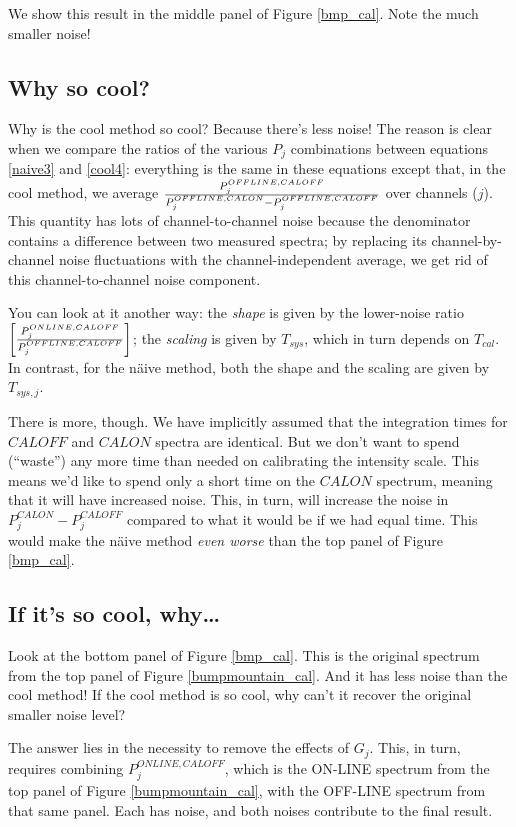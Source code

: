 \noindent We show this result in the middle panel of Figure
\ref{bmp_cal}. Note the much smaller noise!


\subsection{Why so cool?}

	Why is the cool method so cool? Because there's less noise! The
reason is clear when we compare the ratios of the various $P_j$
combinations between equations \ref{naive3} and \ref{cool4}: everything
is the same in these equations except that, in the cool method, we
average ${P_j^{OFFLINE,CALOFF} \over  P_j^{OFFLINE,CALON} - P_j^{OFFLINE,CALOFF}}$ over
channels ($j$). This quantity has lots of channel-to-channel noise
because the denominator contains a difference between two measured
spectra; by replacing its channel-by-channel noise fluctuations with the
channel-independent average, we get rid of this channel-to-channel noise
component. 

	You can look at it another way: the {\it shape} is given by the
lower-noise ratio $\left[ {P_j^{ONLINE, CALOFF} \over P_j^{OFFLINE, CALOFF}} 
\right]$; the {\it scaling} is given by $T_{sys}$, which in turn depends
on $T_{cal}$. In contrast, for the n\"aive method, both the shape and
the scaling are given by $T_{sys,j}$.

	There is more, though. We have implicitly assumed that the
integration times for $CALOFF$ and $CALON$ spectra are identical. But we
don't want to spend (``waste'') any more time than needed on calibrating
the intensity scale. This means we'd like to spend only a short time on
the $CALON$ spectrum, meaning that it will have increased noise. This,
in turn, will increase the noise in $P_j^{CALON} - P_j^{CALOFF}$
compared to what it would be if we had equal time. This would make the
n\"aive method {\it even worse} than the top panel of Figure
\ref{bmp_cal}.

\subsection{If it's so cool, why\dots}

	Look at the bottom panel of Figure \ref{bmp_cal}. This is the
original spectrum from the top panel of Figure \ref{bumpmountain_cal}.
And it has less noise than the cool method! If the cool method is so
cool, why can't it recover the original smaller noise level?

	The answer lies in the necessity to remove the effects of $G_j$.
This, in turn, requires combining $P_j^{ONLINE, CALOFF}$, which is the
ON-LINE spectrum from the top panel of Figure \ref{bumpmountain_cal},
with the OFF-LINE spectrum from that same panel. Each has noise, and
both noises contribute to the final result.

